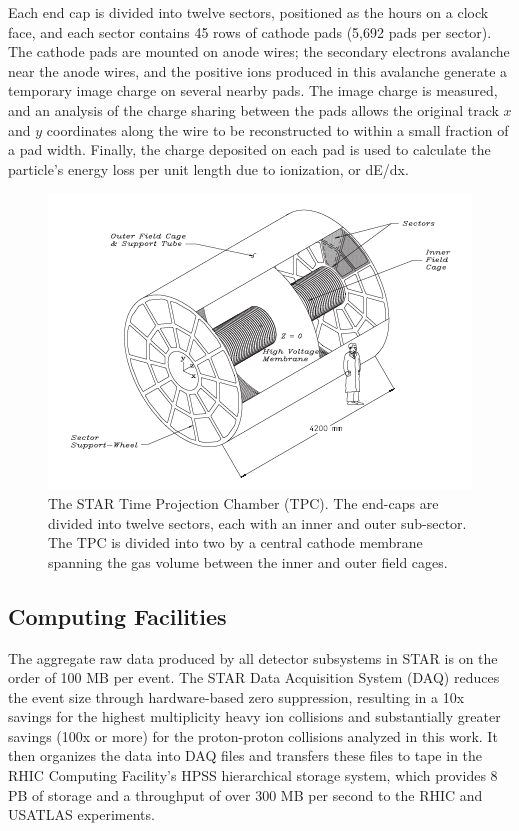 Each end cap is divided into twelve sectors, positioned as the hours on a clock face, and each sector contains 45 rows of cathode pads (5,692 pads per sector).  The cathode pads are mounted on anode wires; the secondary electrons avalanche near the anode wires, and the positive ions produced in this avalanche generate a temporary image charge on several nearby pads.  The image charge is measured, and an analysis of the charge sharing between the pads allows the original track $x$ and $y$ coordinates along the wire to be reconstructed to within a small fraction of a pad width.  Finally, the charge deposited on each pad is used to calculate the particle's energy loss per unit length due to ionization, or dE/dx.

\begin{figure}
  \includegraphics[width=1.0\textwidth]{figures/tpc}
  \caption{The STAR Time Projection Chamber (TPC).  The end-caps are divided into twelve sectors, each with an inner and outer sub-sector.  The TPC is divided into two by a central cathode membrane spanning the gas volume between the inner and outer field cages.}
  \label{fig:tpc}
\end{figure}

\subsection{Computing Facilities}

The aggregate raw data produced by all detector subsystems in STAR is on the order of 100 MB per event.  The STAR Data Acquisition System (DAQ) \cite{Landgraf:2002zw} reduces the event size through hardware-based zero suppression, resulting in a 10x savings for the highest multiplicity heavy ion collisions and substantially greater savings (100x or more) for the proton-proton collisions analyzed in this work.  It then organizes the data into DAQ files and transfers these files to tape in the RHIC Computing Facility's HPSS hierarchical storage system, which provides 8 PB of storage and a throughput of over 300 MB per second to the RHIC and USATLAS experiments.

